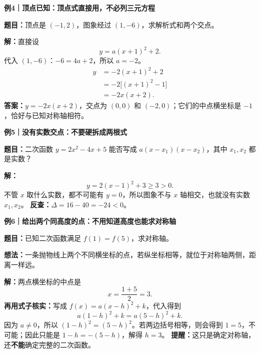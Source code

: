 \begin{examplebox}
\textbf{\textcolor{CExample}{例4｜顶点已知：顶点式直接用，不必列三元方程}}


\textbf{题目：}顶点是 $(-1,2)$，图象经过 $(1,-6)$，求解析式和两个交点。

\textbf{解：}直接设
\[
y=a(x+1)^2+2.
\]
代入 $(1,-6)$：$-6=4a+2$，所以 $a=-2$。
\[
\begin{aligned}
y&=-2(x+1)^2+2\\
&=-2\bigl[(x+1)^2-1\bigr]\\
&=-2x(x+2).
\end{aligned}
\]
\textbf{答案：}$y=-2x(x+2)$，交点为 $(0,0)$ 和 $(-2,0)$；它们的中点横坐标是 $-1$，恰好与已知对称轴相符。

\medskip

\end{examplebox}
\clearpage
\begin{examplebox}
\textbf{\textcolor{CExample}{例5｜没有实数交点：不要硬拆成两根式}}


\textbf{题目：}二次函数 $y=2x^2-4x+5$ 能否写成 $a(x-x_1)(x-x_2)$，其中 $x_1,x_2$ 都是实数？

\textbf{解：}
\[
y=2(x-1)^2+3\ge3>0.
\]
不管 $x$ 取什么实数，都不可能有 $y=0$，所以图象不与 $x$ 轴相交，也就没有实数 $x_1,x_2$。
\textbf{反查：}$\Delta=16-40=-24<0$。

\medskip

\end{examplebox}
\clearpage
\begin{examplebox}
\textbf{\textcolor{CExample}{例6｜给出两个同高度的点：不用知道高度也能求对称轴}}


\textbf{题目：}已知二次函数满足 $f(1)=f(5)$，求对称轴。

\textbf{想法：}一条抛物线上两个不同横坐标的点，若纵坐标相等，就位于对称轴两侧，距离一样远。

\textbf{解：}两点横坐标的中点是
\[
\boxed{x=\frac{1+5}{2}=3.}
\]
\textbf{再用式子核实：}写成 $f(x)=a(x-h)^2+k$，代入得到
\[
a(1-h)^2+k=a(5-h)^2+k.
\]
因为 $a\ne0$，所以 $(1-h)^2=(5-h)^2$。若两边括号相等，则会得到 $1=5$，不可能；因此只能是
$1-h=-(5-h)$，解得 $h=3$。
\textbf{提醒：}这只是确定对称轴，还\textbf{不能}确定完整的二次函数。

\medskip

\end{examplebox}
\clearpage
